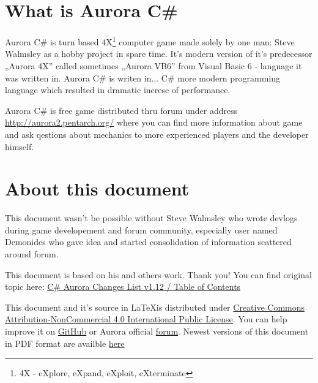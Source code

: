 \documentclass[../Aurora C# unofficial manual.tex]{subfiles}
\begin{document}
	\section{What is Aurora C\#}
	Aurora C\# is turn based 4X\footnote{4X - eXplore, eXpand, eXploit, eXterminate}
	computer game made solely by one man: Steve Walmsley as a hobby project in spare time.
	It's modern version of it's predecessor „Aurora 4X” called sometimes „Aurora VB6” from
	Visual Basic 6 - language it was written in. Aurora C\# is writen in... C\# more modern
	programming language which resulted in dramatic increse of performance.
	
	Aurora C\# is free game distributed thru forum under address
	\href{http://aurora2.pentarch.org/}{http://aurora2.pentarch.org/} where you can find
	more information about game and ask qestions about mechanics to more experienced
	players and the developer himself.
	
	
	\section{About this document}
	This document wasn't be possible without Steve Walmsley who wrote devlogs during game
	developement and forum community, especially user named Demonides who gave idea and
	started consolidation of information scattered around forum.
	
	This document is based on his and others work. Thank you! You can find original topic
	here: \href{http://aurora2.pentarch.org/index.php?topic=10666.0}{C\# Aurora Changes List v1.12 / Table of Contents}
	
	This document and it's source in \LaTeX is distributed under \href{https://creativecommons.org/licenses/by-nc/4.0/}{Creative Commons Attribution-NonCommercial 4.0 International Public License}. You can help improve it
	on \href{https://github.com/Pawel82S/Aurora-C-Sharp-manual}{GitHub} or Aurora official \href{http://aurora2.pentarch.org/}{forum}. Newest versions of this document in PDF format are availble \href{https://drive.google.com/drive/u/1/folders/1_AWEpFhS7e7ouguzrx8u0gnBHPhmjHoI}{here}
\end{document}
